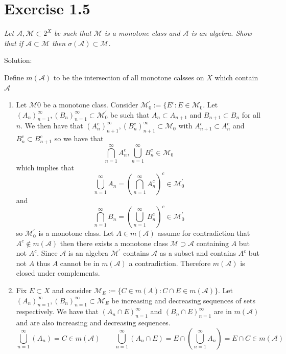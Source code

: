 \documentclass[11pt]{article}
\newcommand{\solution}[1]{{{\textcolor{header}{Solution:} \textcolor{solution}{#1}}}}
\begin{document}
\section{Exercise 1.5}
\emph{
    Let $ \mathcal{A}, \mathcal{M} \subset 2^{X} $ be such that $\mathcal{M}$ is a monotone class
    and  $ \mathcal{A}$ is an algebra. Show that if $ \mathcal{A} \subset \mathcal{M}$ then $\sigma( \mathcal{A}) \subset \mathcal{M}$.
}
\solution{
    Define $m( \mathcal{A})$ to be the intersection of all monotone calsses on $X$ which contain $ \mathcal{A}$
    \begin{enumerate}
        \item Let $\mathcal{M}0$ be a monotone class. Consider  $\mathcal{M}_0^{'} := \{E^{c}: E \in \mathcal{M}_0 $.
            Let $(A_n)_{n=1}^{\infty}, (B_n)_{n=1}^{\infty} \subset \mathcal{M}_0^{'}$ be such that
            $A_n \subset A_{n+1}$ and $B_{n+1} \subset B_n$ for all $n$.
            We then have that $(A_n^{c})_{n+1}^{\infty}, (B_n^{c})_{n+1}^{\infty} \subset \mathcal{M}_0$ 
            with $A_{n+1}^{c} \subset A_n^{c}$ and $B_n^{c} \subset B_{n+1}^{c}$ so we have that
            \[
                \bigcap_{n=1}^{\infty}A_n^{c}, \bigcup_{n=1}^{\infty}B_n^{c} \in \mathcal{M}_0
            \] 
            which implies that
            \[
                \bigcup_{n=1}^{\infty}A_n = (\bigcap_{n=1}^{\infty}A_n^{c})^{c} \in \mathcal{M}_0^{'}
            \] 
            and
            \[
                \bigcap_{n=1}^{\infty}B_n = (\bigcup_{n=1}^{\infty}B_n^{c})^{c} \in \mathcal{M}_0^{'}
            \] 
            so $\mathcal{M}_0^{'}$ is a monotone class.
            Let $ A \in m( \mathcal{A})$ assume for contradiction that $ A^{c} \not\in m( \mathcal{A})$ then there exists a monotone class $  \mathcal{M} \supset \mathcal{A}$ containing $A$ but not $ A^{c}$. 
            Since $ \mathcal{A}$ is an algebra $ \mathcal{M}^{'}$ contains $ \mathcal{A}$ as a subset and contains $ A^{c}$ but not $A$ thus  $ A$ cannot be in  $m( \mathcal{A})$ a contradiction. Therefore
            $m( \mathcal{A})$ is closed under complements.
        \item Fix $E \subset X$ and consider $\mathcal{M}_E := \{C \in m(A): C \cap E \in m( \mathcal{A})\}$.
            Let $(A_n)_{n=1}^{\infty}, (B_n)_{n=1}^{\infty} \subset \mathcal{M}_E$ be increasing and decreasing sequences of sets respectively.
            We have that $(A_n \cap E)_{n=1}^{\infty}$ and $(B_n \cap E)_{n=1}^{\infty}$ are in $m( \mathcal{A})$ and are also increasing and decreasing sequences.
            \[
                \bigcup_{n=1}^{\infty}(A_n) = C \in m( \mathcal{A}) \qquad \bigcup_{n=1}^{\infty}(A_n \cap E) = E \cap (\bigcup_{n=1}^{\infty} A_n) = E \cap C \in m( \mathcal{A})
\]
\end{enumerate}}
\end{document}
